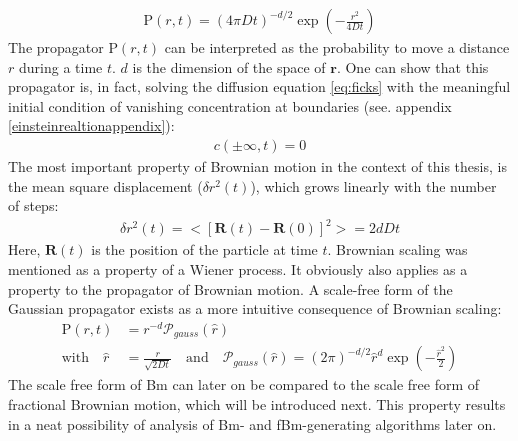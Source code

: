 \documentclass[
  a4paper,BCOR10mm,twoside,
  headsepline,footsepline,%
  fleqn,openbib
]{scrbook}
\begin{document}
\begin{align}
 \mathrm{P}(r,t)=  \left(4 \pi D t\right)^{-d/2} \exp \left(- \frac{r^2}{4 D t} \right) \label{propagator}
\end{align}
The propagator $\mathrm{P}(r,t)$ can be interpreted as the probability to move a distance $r$ during a time $t$. $d$ is the dimension of the space of $\bm{r}$. One can show that this propagator is, in fact, solving the diffusion equation \cref{eq:ficks} with the meaningful initial condition of vanishing concentration at boundaries (see. appendix \ref{einsteinrealtionappendix}): 
\begin{align}
c(\pm \infty,t)=0
\end{align}
The most important property of Brownian motion in the context of this thesis, is the mean square displacement ($\delta r^2(t)$), which grows linearly with the number of steps: 
\begin{align}
\delta r^2(t)=<[\bm{R}(t)-\bm{R}(0)]^2>= 2dDt                                                                                                                                                                                                                                                                                                                                \end{align}
Here, $\bm{R}(t)$ is the position of the particle at time $t$.
Brownian scaling was mentioned as a property of a Wiener process. It obviously also applies as a property to the propagator of Brownian motion. A scale-free form of the Gaussian propagator exists as a more intuitive consequence of Brownian scaling: 
\begin{align}
\mathrm{P}(r,t)&= r^{-d} \mathcal{P}_{gauss}(\hat{r}) \\ \text{with} \quad \hat{r} &= \frac{r}{\sqrt{2Dt}} \quad \text{and} \quad \mathcal{P}_{gauss}(\hat{r})= (2 \pi)^{-d/2}  \hat{r}^d \exp \left(- \frac{\hat{r}^2}{2} \right) \label{scalefreeform} 
\end{align}
The scale free form of Bm can later on be compared to the scale free form of fractional Brownian motion, which will be introduced next. This property results in a neat possibility of analysis of Bm- and fBm-generating algorithms later on.


\end{document}
